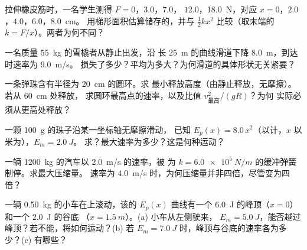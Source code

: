 \begin{exercise}[$\star\star$]\label{exo:g12:work-and-energy:7}
拉伸橡皮筋时，一名学生测得 $F = 0$，$3.0$，$7.0$，
$12.0$，\qty{18.0}{N}，对应 $x = 0$，$2.0$，$4.0$，$6.0$，\qty{8.0}{cm}。
用梯形面积估算储存的，并与
$\tfrac12 kx^2$ 比较（取末端的 $k = F/x$）。两者为何不同？
\end{exercise}

\begin{exercise}[$\star\star$]\label{exo:g12:work-and-energy:8}
一名质量 \qty{55}{kg} 的雪橇者从静止出发，沿
长 \qty{25}{m} 的曲线滑道下降 \qty{8.0}{m}，到达时速率为 \qty{9.0}{m/s}。
损失了多少？平均为多大？为何滑道的具体形状无关紧要？
\end{exercise}

\begin{exercise}[$\star\star$]\label{exo:g12:work-and-energy:9}
一条弹珠含有半径为 \qty{20}{cm} 的圆环。求
最小释放高度（由静止释放，无摩擦）。若从 \qty{60}{cm} 处释放，
求圆环最高点的速率，以及比值 $v_{\text{最高}}^2/(gR)$？为何
实际必须从更高处释放？
\end{exercise}

\begin{exercise}[$\star\star$]\label{exo:g12:work-and-energy:10}
一颗 \qty{100}{g} 的珠子沿某一坐标轴无摩擦滑动，
已知 $E_p(x) = 8.0\,x^2$（以计，$x$ 以米为），$E_m = \qty{2.0}{J}$。
求？最大速率为多少？这是何种运动？
\end{exercise}

\begin{exercise}[$\star\star$]\label{exo:g12:work-and-energy:11}
一辆 \qty{1200}{kg} 的汽车以 \qty{2.0}{m/s} 的速率，被
为 $k = \qty{6.0e5}{N/m}$ 的缓冲弹簧制停。求最大压缩量。
速率为 \qty{4.0}{m/s} 时，为何压缩量并非四倍，尽管变为四倍？
\end{exercise}

\begin{exercise}[$\star\star\star$]\label{exo:g12:work-and-energy:12}
一辆 \qty{0.50}{kg} 的小车在上滚动，该的 $E_p(x)$ 曲线有一个
\qty{6.0}{J} 的峰顶（$x = 0$）和一个 \qty{2.0}{J} 的谷底
（$x = \qty{1.5}{m}$）。(a) 小车从左侧驶来，
 $E_m = \qty{5.0}{J}$，能否越过峰顶？若不能，将如何运动？(b) 若
$E_m = \qty{7.0}{J}$ 时，峰顶与谷底的速率各为多少？(c) 有哪些？
\end{exercise}

